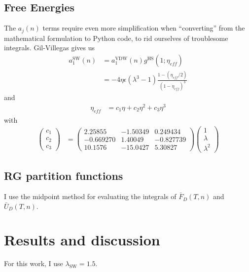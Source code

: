 \documentclass[letterpaper,twocolumn,amsmath,amssymb,prb]{revtex4-1}
\newcommand{\1}{\ensuremath{\textbf{r}_1}}
\newcommand{\2}{\ensuremath{\textbf{r}_2}}
\newcommand{\3}{\ensuremath{\textbf{r}_3}}
\newcommand{\4}{\ensuremath{\textbf{r}_4}}
\newcommand{\FbarD}{\ensuremath{\bar{F}_D(T,n)}}
\newcommand{\UbarD}{\ensuremath{\bar{U}_D(T,n)}}
\begin{document}
\subsection{Free Energies}\label{subsec:free-energies}
The $a_j(n)$ terms require even more simplification when
``converting'' from the mathematical formulation to Python code, to
rid ourselves of troublesome integrals. Gil-Villegas gives us
\newcommand\eff{\textit{eff}}
\begin{align}
  a_1^\text{SW}(n) &= a_1^\text{VDW}(n)g^\text{HS}(1;\eta_{\eff}) \\
  &= -4\eta\epsilon(\lambda^3 - 1)\frac{1 - \left( \eta_{\eff}/2 \right)}{(1 - \eta_{\eff})^3}
\end{align}
and
\begin{align}
  \eta_{\eff} &= c_1\eta + c_2\eta^2 + c_3\eta^3
\end{align}
with
\begin{align}
  \left( \begin{array}{c}
    c_1 \\
    c_2 \\
    c_3
    \end{array} \right)
  &= \left( \begin{array}{ccc}
    2.25855 & -1.50349 & 0.249434 \\
    -0.669270 & 1.40049 & -0.827739 \\
    10.1576 & -15.0427 & 5.30827
    \end{array} \right)
  \left( \begin{array}{c}
    1 \\
    \lambda \\
    \lambda^2
    \end{array} \right)
\end{align}

\subsection{RG partition functions}\label{subsec:fbar-ubar}
I use the midpoint method for evaluating the integrals of $\FbarD$
and $\UbarD$.

\section{Results and discussion}\label{sec:results}

For this work, I use $\lambda_\text{SW} = 1.5$.
\end{document}
